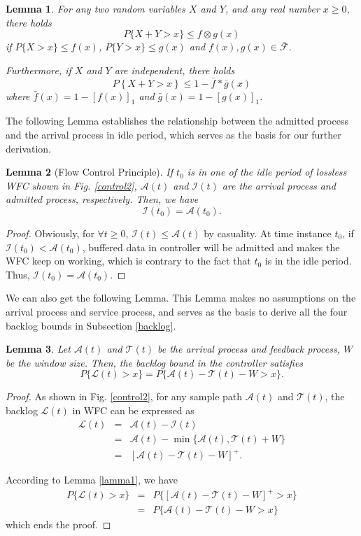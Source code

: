 \documentclass[12pt]{article}
\newtheorem{lemma}{Lemma}
\newtheorem{proof}{Proof}
\begin{document}
\begin{lemma}\label{lamma3}
For any two random variables $X$ and $Y$, and any real number $x\geq 0$, there holds
$$P\{X+Y>x\}\leq f\otimes g(x)$$
if $P\{X>x\}\leq f(x)$, $P\{Y>x\}\leq g(x)$ and $f(x),g(x)\in\bar{\mathcal{F}}$.

Furthermore, if $X$ and $Y$ are independent, there holds
$$P\left\{X+Y>x\right\}\leq 1-\bar{f}\ast\bar{g}(x)$$
where $\bar{f}(x)=1-[f(x)]_1$ and $\bar{g}(x)=1-[g(x)]_1$.
\end{lemma}

The following Lemma establishes the relationship between the admitted process and the arrival process in idle period, which serves as the basis for our further derivation.
\begin{lemma}[Flow Control Principle]\label{lama1}
If $t_0$ is in one of the idle period of lossless WFC shown in Fig. \ref{control2}, $\mathcal{A}(t)$ and $\mathcal{I}(t)$ are the arrival process and admitted process, respectively. Then, we have
\begin{equation}
\mathcal{I}(t_0)=\mathcal{A}(t_0).
\end{equation}
\end{lemma}
\begin{proof}
Obviously, for $\forall t\geq 0$, $\mathcal{I}(t)\leq \mathcal{A}(t)$ by casuality. At time instance $t_0$, if $\mathcal{I}(t_0)<\mathcal{A}(t_0)$, buffered data in controller will be admitted and makes the WFC keep on working, which is contrary to the fact that $t_0$ is in the idle period. Thus, $\mathcal{I}(t_0)=\mathcal{A}(t_0)$.
\end{proof}

We can also get the following Lemma. This Lemma makes no assumptions on the arrival process and service process, and serves as the basis to derive all the four backlog bounds in Subsection \ref{backlog}.
\begin{lemma}\label{lama2}
Let $\mathcal{A}(t)$ and $\mathcal{T}(t)$ be the arrival process and feedback process, $W$ be the window size. Then, the backlog bound in the controller satisfies
$$P\{\mathcal{L}(t)> x\}=P\{\mathcal{A}(t)-\mathcal{T}(t)-W> x\}.$$
\end{lemma}
\begin{proof}
As shown in Fig. \ref{control2}, for any sample path $\mathcal{A}(t)$ and $\mathcal{T}(t)$, the backlog $\mathcal{L}(t)$ in WFC can be expressed as
\begin{eqnarray}
  \mathcal{L}(t)&=&\mathcal{A}(t)-\mathcal{I}(t)\nonumber\\
      &=&\mathcal{A}(t)-\min\{\mathcal{A}(t),\mathcal{T}(t)+W\}\nonumber\\
      &=&[\mathcal{A}(t)-\mathcal{T}(t)-W]^+.\nonumber
\end{eqnarray}

According to Lemma \ref{lamma1}, we have
\begin{eqnarray*}
  P\{\mathcal{L}(t)>x\}&=&P\{[\mathcal{A}(t)-\mathcal{T}(t)-W]^+>x\}\\
  &=&P\{\mathcal{A}(t)-\mathcal{T}(t)-W>x\}
\end{eqnarray*}
which ends the proof.
\end{proof}
\end{document}
